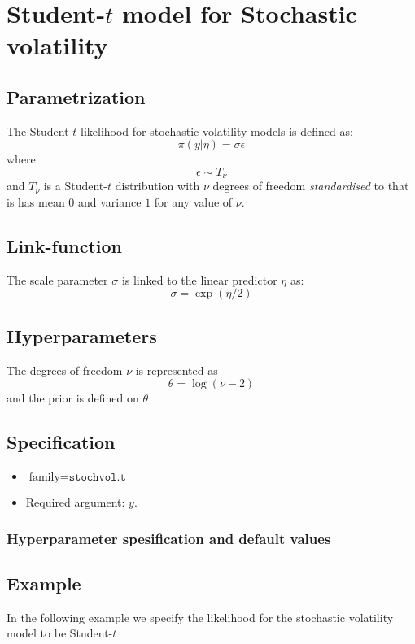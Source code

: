\documentclass[a4paper,11pt]{article}
\begin{document}
\section*{Student-$t$ model for Stochastic volatility}

\subsection*{Parametrization}

The Student-$t$ likelihood for stochastic volatility models is defined as:
\[
\pi(y |\eta )=\sigma \epsilon 
\]
where
\[
\epsilon \sim T_{\nu}
\]
and $T_{\nu}$ is a Student-$t$ distribution with $\nu$ degrees of freedom {\it standardised} to that is has mean $0$ and variance $1$ for any value of $\nu$.

\subsection*{Link-function}

The scale parameter $\sigma $ is linked to the linear predictor $\eta $ as:
\[
\sigma =\exp(\eta /2)
\]

\subsection*{Hyperparameters}

The degrees of freedom $\nu$ is represented as
\[
\theta=\log(\nu-2)
\]
and the prior is defined on $\theta$

\subsection*{Specification}

\begin{itemize}
\item $\text{family}=\texttt{stochvol.t}$
\item Required argument: $y$.
\end{itemize}

\subsubsection*{Hyperparameter spesification and default values}


\subsection*{Example}
In the following example we specify the likelihood for the stochastic
volatility model to be Student-$t$
 
\end{document}
